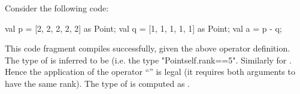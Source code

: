 \begin{example}
Consider the following code:  
\begin{xten}
val p  = [2, 2, 2, 2, 2] as Point;
val q = [1, 1, 1, 1, 1] as Point;
val a = p - q;    
\end{xten}
This code fragment compiles successfully, given the above operator definition. 
The type of  is inferred to be  (i.e.{} the type \Xcd"Point{self.rank==5}".
Similarly for . Hence the application of the operator ``\Xcd{-}'' is legal (it requires both arguments to have the same rank). The type of  is computed as .
\end{example}
